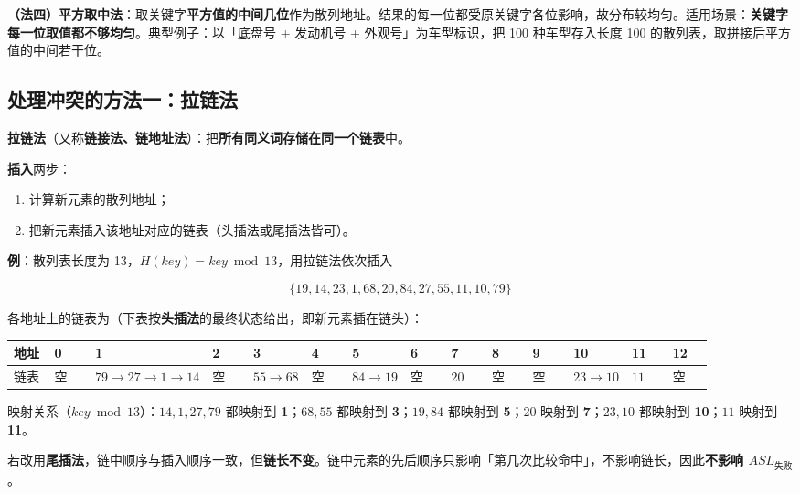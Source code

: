 \documentclass[11pt,openany,UTF8]{ctexbook}
\begin{document}
\textbf{（法四）平方取中法}：取关键字\textbf{平方值的中间几位}作为散列地址。结果的每一位都受原关键字各位影响，故分布较均匀。适用场景：\textbf{关键字每一位取值都不够均匀}。典型例子：以「底盘号 + 发动机号 + 外观号」为车型标识，把 100 种车型存入长度 100 的散列表，取拼接后平方值的中间若干位。

\subsection{处理冲突的方法一：拉链法}

\textbf{拉链法}（又称\textbf{链接法、链地址法}）：把\textbf{所有同义词存储在同一个链表}中。

\textbf{插入}两步：

\begin{enumerate}
\item 计算新元素的散列地址；
\item 把新元素插入该地址对应的链表（头插法或尾插法皆可）。
\end{enumerate}
\textbf{例}：散列表长度为 13，$H(key)=key\bmod 13$，用拉链法依次插入

\[\{19,14,23,1,68,20,84,27,55,11,10,79\}\]

各地址上的链表为（下表按\textbf{头插法}的最终状态给出，即新元素插在链头）：

\begingroup\footnotesize\setlength{\tabcolsep}{1.5pt}
\begin{longtable}{@{}L{0.0636\linewidth}L{0.0636\linewidth}L{0.0636\linewidth}L{0.0636\linewidth}L{0.0636\linewidth}L{0.0636\linewidth}L{0.0636\linewidth}L{0.0636\linewidth}L{0.0636\linewidth}L{0.0636\linewidth}L{0.0636\linewidth}L{0.0636\linewidth}L{0.0636\linewidth}L{0.0636\linewidth}@{}}
\toprule
\textbf{地址} & \textbf{0} & \textbf{1} & \textbf{2} & \textbf{3} & \textbf{4} & \textbf{5} & \textbf{6} & \textbf{7} & \textbf{8} & \textbf{9} & \textbf{10} & \textbf{11} & \textbf{12} \\
\midrule
\endhead
链表 & 空 & $79\to 27\to 1\to 14$ & 空 & $55\to 68$ & 空 & $84\to 19$ & 空 & $20$ & 空 & 空 & $23\to 10$ & $11$ & 空 \\
\bottomrule
\end{longtable}
\endgroup

映射关系（$key\bmod 13$）：$14,1,27,79$ 都映射到 \textbf{1}；$68,55$ 都映射到 \textbf{3}；$19,84$ 都映射到 \textbf{5}；$20$ 映射到 \textbf{7}；$23,10$ 都映射到 \textbf{10}；$11$ 映射到 \textbf{11}。

若改用\textbf{尾插法}，链中顺序与插入顺序一致，但\textbf{链长不变}。链中元素的先后顺序只影响「第几次比较命中」，不影响链长，因此\textbf{不影响 $ASL_{失败}$}。
\end{document}
